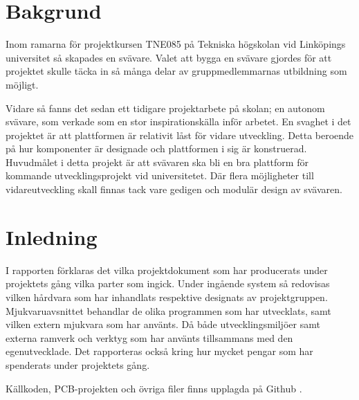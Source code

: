 \section{Bakgrund}
Inom ramarna för projektkursen TNE085 på Tekniska högskolan vid Linköpings
universitet så skapades en svävare. Valet att bygga en svävare gjordes för att
projektet skulle täcka in så många delar av gruppmedlemmarnas utbildning som
möjligt.

Vidare så fanns det sedan ett tidigare projektarbete på skolan; en autonom
svävare, som verkade som en stor inspirationskälla inför arbetet. En svaghet i
det projektet är att plattformen är relativit låst för vidare utveckling. Detta beroende på
hur komponenter är designade och plattformen i sig är konstruerad. Huvudmålet
i detta projekt är att svävaren ska bli en bra plattform för kommande
utvecklingsprojekt vid universitetet. Där flera möjligheter till
vidareutveckling skall finnas tack vare gedigen och modulär design av svävaren.

\section{Inledning}
I rapporten förklaras det vilka projektdokument som har producerats under
projektets gång vilka parter som ingick. Under ingående system så redovisas
vilken hårdvara som har inhandlats respektive designats av projektgruppen.
Mjukvaruavsnittet behandlar de olika programmen som har utvecklats, samt vilken
extern mjukvara som har använts. Då både utvecklingsmiljöer samt externa
ramverk och verktyg som har använts tillsammans med den egenutvecklade. Det
rapporteras också kring hur mycket pengar som har spenderats under projektets
gång.

Källkoden, PCB-projekten och övriga filer finns upplagda på Github \cite{Source
code}.
